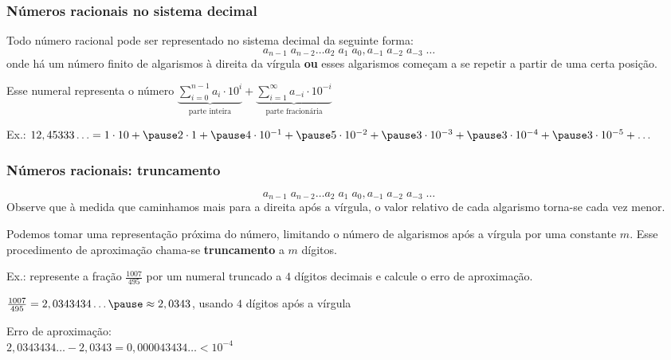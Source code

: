 \documentclass{beamer}
\begin{document}
\begin{frame}
\frametitle{Números racionais no sistema decimal}

Todo número racional pode ser representado no sistema decimal da seguinte forma:
\[
a_{n-1} \; a_{n-2} \ldots a_2 \; a_1 \; a_0 , a_{-1} \; a_{-2} \; a_{-3} \; \ldots
\]
onde há um número finito de algarismos à direita da vírgula \textbf{ou} esses algarismos começam a se repetir a partir de uma certa posição.

\pause Esse numeral representa o número $\displaystyle \underbrace{\sum_{i = 0}^{n-1} a_i \cdot 10^i}_{\text{parte inteira}} + \underbrace{\sum_{i = 1}^{\infty} a_{-i} \cdot 10^{-i}}_{\text{parte fracionária}}$

\pause

Ex.: $12,45333\ldots = 1\cdot10 + \pause 2\cdot1 + \pause 4\cdot10^{-1} + \pause 5 \cdot 10^{-2} + \pause 3 \cdot 10^{-3} + \pause 3 \cdot 10^{-4} + \pause 3 \cdot 10^{-5} + \ldots$
\end{frame}

\begin{frame}
\frametitle{Números racionais: truncamento}

\[
a_{n-1} \; a_{n-2} \ldots a_2 \; a_1 \; a_0 , a_{-1} \; a_{-2} \; a_{-3} \; \ldots
\]
Observe que à medida que caminhamos mais para a direita após a vírgula, o valor relativo de cada algarismo torna-se cada vez menor.

\pause

\vspace{12pt}

Podemos tomar uma representação próxima do número, limitando o número de algarismos após a vírgula por uma constante $m$. Esse procedimento de aproximação chama-se \textbf{truncamento} a $m$ dígitos.

\pause

\vspace{12pt}

Ex.: represente a fração $\frac{1007}{495}$ por um numeral truncado a $4$ dígitos decimais e calcule o erro de aproximação.

\pause

\vspace{6pt}

$\frac{1007}{495} = 2,0343434\ldots \pause \approx 2,0343$, usando $4$ dígitos após a vírgula

\pause

\vspace{6pt}

Erro de aproximação:\\$2,0343434\ldots - 2,0343 = 0,000043434\ldots < 10^{-4}$
\end{frame}
\end{document}
